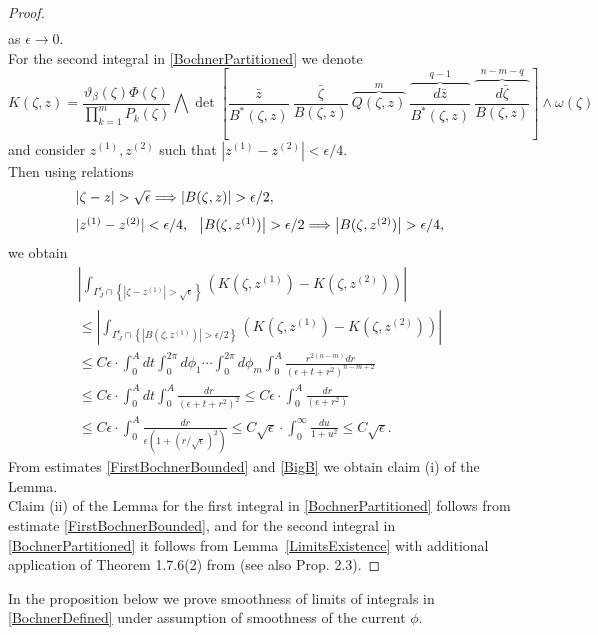\documentclass[11pt,reqno]{amsart}
\numberwithin{equation}{section}
\begin{document}
\begin{proof}
\begin{multline}
\end{multline}
as $\epsilon\to 0$.\\
\indent
For the second integral in \eqref{BochnerPartitioned} we denote
$$K(\zeta,z)=\frac{\vartheta_{\beta}(\zeta)\Phi(\zeta)}{\prod_{k=1}^mP_k(\zeta)}
\bigwedge\det\left[\frac{\bar z}{B^*(\zeta,z)}\ \frac{\bar\zeta}{B(\zeta,z)}\
\overbrace{Q(\zeta,z)}^{m}\
\overbrace{\frac{d{\bar z}}{B^*(\zeta,z)}}^{q-1}\
\overbrace{\frac{d{\bar\zeta}}{B(\zeta,z)}}^{n-m-q}\right]\wedge\omega(\zeta)$$
and consider $z^{(1)}, z^{(2)}$ such that $|z^{(1)}-z^{(2)}|<\epsilon/4$.\\
\indent
Then using relations
$$\begin{array}{ll}
|\zeta-z|>\sqrt{\epsilon}\Longrightarrow \left|B(\zeta,z)\right|>\epsilon/2,
\vspace{0.1in}\\
|z^{(1)}-z^{(2)}|<\epsilon/4,\hspace{0.1in}\left|B(\zeta,z^{(1)})\right|>\epsilon/2
\Longrightarrow \left|B(\zeta,z^{(2)})\right|>\epsilon/4,
\end{array}$$
we obtain
\begin{multline}\label{BigB}
\left|\int_{\Gamma^{\epsilon}_J\cap\left\{|\zeta-z^{(1)}|>\sqrt{\epsilon}\right\}}
\left(K(\zeta,z^{(1)})-K(\zeta,z^{(2)})\right)\right|\\
\leq\left|\int_{\Gamma^{\epsilon}_J\cap\left\{\left|B(\zeta,z^{(1)})\right|>\epsilon/2\right\}}
\left(K(\zeta,z^{(1)})-K(\zeta,z^{(2)})\right)\right|\\
\leq C\epsilon\cdot\int_0^{A}dt
\int_0^{2\pi} d\phi_1\cdots\int_0^{2\pi} d\phi_m
\int_0^{A}\frac{r^{2(n-m)}dr}{\left(\epsilon+t+r^2\right)^{n-m+2}}\\
\leq C\epsilon\cdot\int_0^{A}dt\int_0^{A}
\frac{dr}{\left(\epsilon+t+r^2\right)^2}
\leq C\epsilon\cdot \int_0^{A}\frac{dr}{\left(\epsilon+r^2\right)}\\
\leq C\epsilon\cdot \int_0^{A}
\frac{dr}{\epsilon\left(1+\left(r/\sqrt{\epsilon}\right)^2\right)}
\leq C\sqrt{\epsilon}\cdot \int_0^{\infty}\frac{du}{1+u^2}\leq C\sqrt{\epsilon}.
\end{multline}
\indent
From estimates \eqref{FirstBochnerBounded} and \eqref{BigB} we obtain claim (i)
of the Lemma.\\
\indent
Claim (ii) of the Lemma for the first integral in \eqref{BochnerPartitioned} follows
from estimate \eqref{FirstBochnerBounded}, and for the second integral in
\eqref{BochnerPartitioned} it follows from Lemma~\ref{LimitsExistence} with additional
application of Theorem 1.7.6(2) from \cite{CH} (see also \cite{HP3} Prop. 2.3).
\end{proof}
\indent
In the proposition below we prove smoothness of limits of integrals in \eqref{BochnerDefined}
under assumption of smoothness of the current $\phi$.
\end{document}
